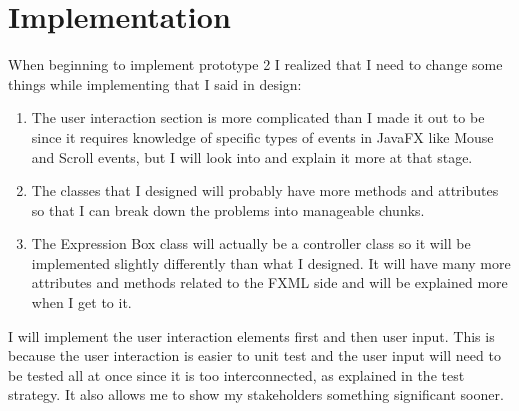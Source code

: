 \documentclass[../../../main.tex]{subfiles}
\begin{document}
\chapter{Implementation}
When beginning to implement prototype 2 I realized that I need to change some things while implementing that I said in design:
\begin{enumerate}
\item The user interaction section is more complicated than I made it out to be since it requires knowledge of specific types of events in JavaFX like Mouse and Scroll events, but I will look into and explain it more at that stage.
\item The classes that I designed will probably have more methods and attributes so that I can break down the problems into manageable chunks.
\item The Expression Box class will actually be a controller class so it will be implemented slightly differently than what I designed. It will have many more attributes and methods related to the FXML side and will be explained more when I get to it.
\end{enumerate}
I will implement the user interaction elements first and then user input. This is because the user interaction is easier to unit test and the user input will need to be tested all at once since it is too interconnected, as explained in the test strategy. It also allows me to show my stakeholders something significant sooner.
\newpage
\end{document}
